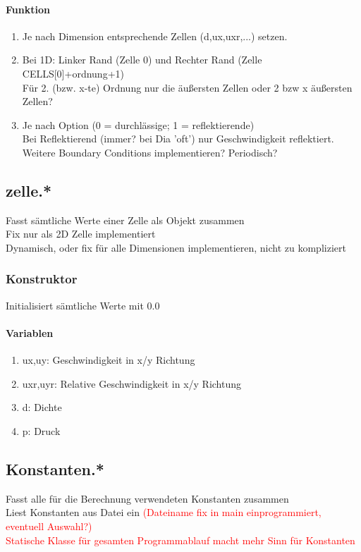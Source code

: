 \documentclass[12pt]{article}
\begin{document}
\renewcommand{\labelenumi}{\theenumi.} 
\paragraph{Funktion}
\begin{enumerate}
	\item Je nach Dimension entsprechende Zellen (d,ux,uxr,...) setzen.
	\item Bei 1D: Linker Rand (Zelle 0) und Rechter Rand (Zelle CELLS[0]+ordnung+1)\\
	Für 2. (bzw. x-te) Ordnung nur die äußersten Zellen oder 2 bzw x äußersten Zellen?
	\item Je nach Option (0 = durchlässige; 1 = reflektierende)\\
	Bei Reflektierend (immer? bei Dia 'oft') nur Geschwindigkeit reflektiert.\\
	Weitere Boundary Conditions implementieren? Periodisch?
\end{enumerate}

\subsection{zelle.*}
Fasst sämtliche Werte einer Zelle als Objekt zusammen\\
Fix nur als 2D Zelle implementiert\\
Dynamisch, oder fix für alle Dimensionen implementieren, nicht zu kompliziert

\subsubsection{Konstruktor}
Initialisiert sämtliche Werte mit 0.0

\renewcommand{\labelenumi}{\alph{enumi})} 
\paragraph{Variablen}
\begin{enumerate}
	\item ux,uy: Geschwindigkeit in x/y Richtung
	\item uxr,uyr: Relative Geschwindigkeit in x/y Richtung
	\item d: Dichte
	\item p: Druck
\end{enumerate}

\subsection{Konstanten.*}
Fasst alle für die Berechnung verwendeten Konstanten zusammen\\
Liest Konstanten aus Datei ein \textcolor{red}{(Dateiname fix in main einprogrammiert, eventuell Auswahl?)}\\
\textcolor{red}{Statische Klasse für gesamten Programmablauf macht mehr Sinn für Konstanten}
\end{document}
